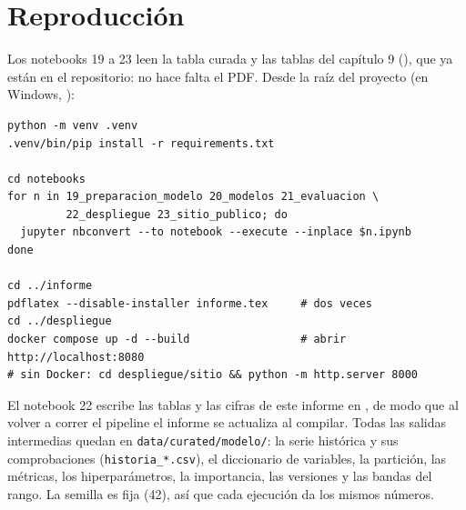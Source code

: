 \documentclass[11pt,a4paper]{article}
\begin{document}
\appendix
\section{Reproducción}

Los notebooks 19 a 23 leen la tabla curada  y las tablas del
capítulo 9 (), que ya están en el repositorio: no hace falta el PDF. Desde la raíz del proyecto (en
Windows, ):

\begin{verbatim}
python -m venv .venv
.venv/bin/pip install -r requirements.txt

cd notebooks
for n in 19_preparacion_modelo 20_modelos 21_evaluacion \
         22_despliegue 23_sitio_publico; do
  jupyter nbconvert --to notebook --execute --inplace $n.ipynb
done

cd ../informe
pdflatex --disable-installer informe.tex     # dos veces
cd ../despliegue
docker compose up -d --build                 # abrir http://localhost:8080
# sin Docker: cd despliegue/sitio && python -m http.server 8000
\end{verbatim}

\noindent El notebook 22 escribe las tablas y las cifras de este informe en , de modo que al
volver a correr el pipeline el informe se actualiza al compilar. Todas las salidas intermedias quedan en
\texttt{data/curated/modelo/}: la serie histórica y sus comprobaciones (\texttt{historia\_*.csv}), el diccionario de
variables, la partición, las métricas, los hiperparámetros, la importancia, las versiones y las bandas del rango. La
semilla es fija (42), así que cada ejecución da los mismos números.
\end{document}
